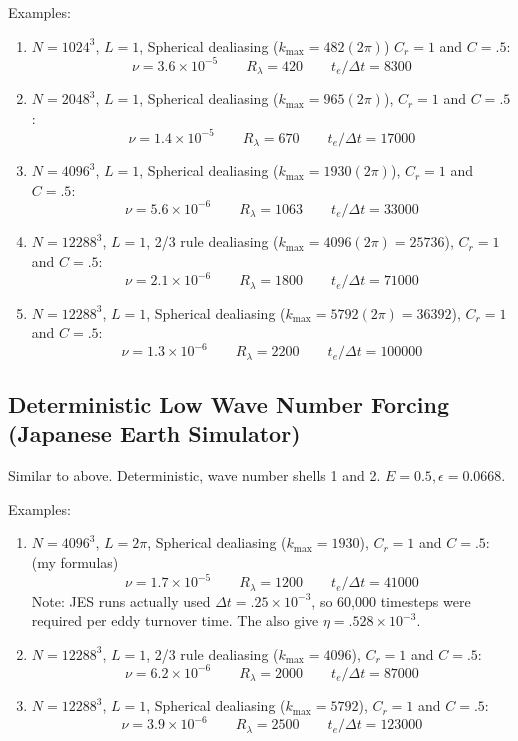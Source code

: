 \documentclass[12pt]{article}
\begin{document}
Examples:
\begin{enumerate}
\item $N=1024^3$, $L=1$, Spherical dealiasing ($k_\text{max} = 482(2\pi)$)
$C_r=1$ and $C=.5$:
\[
\nu = 3.6 \times 10^{-5} \qquad  R_\lambda =  420\qquad t_e / \Delta t = 8300
\]

\item $N=2048^3$, $L=1$, Spherical dealiasing ($k_\text{max} = 965(2\pi)$),
$C_r=1$ and $C=.5$:
\[
\nu = 1.4 \times 10^{-5} \qquad  R_\lambda =  670\qquad t_e / \Delta t = 17000
\]

\item $N=4096^3$, $L=1$, Spherical dealiasing ($k_\text{max} = 1930(2\pi)$),
$C_r=1$ and $C=.5$:
\[
\nu = 5.6 \times 10^{-6} \qquad  R_\lambda =  1063\qquad t_e / \Delta t = 33000
\]

\item $N=12288^3$, $L=1$, 2/3 rule dealiasing ($k_\text{max} = 4096(2\pi) = 25736$), 
$C_r=1$ and $C=.5$:
\[
\nu = 2.1 \times 10^{-6} \qquad  R_\lambda =  1800\qquad t_e/\Delta t = 71000
\]

\item $N=12288^3$, $L=1$, Spherical dealiasing ($k_\text{max} = 5792(2\pi) = 36392$), 
$C_r=1$ and $C=.5$:
\[
\nu = 1.3 \times 10^{-6} \qquad  R_\lambda =  2200 \qquad t_e / \Delta t  = 100000
\]



\end{enumerate}




\subsection{Deterministic Low Wave Number Forcing (Japanese Earth Simulator)}

Similar to above.  Deterministic, wave number shells 1 and 2.
$E=0.5, \epsilon=0.0668$.  

Examples:
\begin{enumerate}
\item $N=4096^3$, $L=2\pi$, Spherical dealiasing ($k_\text{max} = 1930$),
$C_r=1$ and $C=.5$:  (my formulas)
\[
\nu = 1.7 \times 10^{-5} \qquad  R_\lambda =  1200\qquad t_e / \Delta t = 41000
\]
Note: JES runs actually used $\Delta t = .25 \times 10^{-3}$, so 60,000
timesteps were required per eddy turnover time.  The also give $\eta=.528\times10^{-3}$.


\item $N=12288^3$, $L=1$, 2/3 rule dealiasing ($k_\text{max} = 4096$), 
$C_r=1$ and $C=.5$:  
\[
\nu = 6.2 \times 10^{-6} \qquad  R_\lambda =  2000\qquad t_e/\Delta t = 87000
\]

\item $N=12288^3$, $L=1$, Spherical dealiasing ($k_\text{max} = 5792$), 
$C_r=1$ and $C=.5$:  
\[
\nu = 3.9 \times 10^{-6} \qquad  R_\lambda =  2500 \qquad t_e / \Delta t  = 123000
\]



\end{enumerate}
\end{document}
